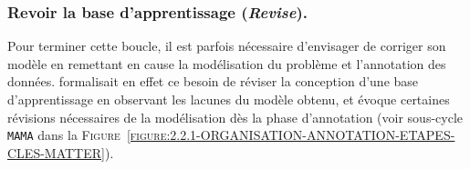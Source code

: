 		\subsubsection{Revoir la base d'apprentissage (\textit{\textbf{R}evise}).}
		\label{section:2.2.1.C-ORGANISATION-ANNOTATION-ETAPES-CLES-REVISE}
		
			Pour terminer cette boucle, il est parfois nécessaire d'envisager de corriger son modèle en remettant en cause la modélisation du problème et l'annotation des données.
			\cite{voormann-gut:2008:agile-corpus-creationa} formalisait en effet ce besoin de réviser la conception d'une base d'apprentissage en observant les lacunes du modèle obtenu, et \cite{pustejovsky-stubbs:2012:natural-language-annotation} évoque certaines révisions nécessaires de la modélisation dès la phase d'annotation (voir sous-cycle \texttt{MAMA} dans la \textsc{Figure~\ref{figure:2.2.1-ORGANISATION-ANNOTATION-ETAPES-CLES-MATTER}}).
			
